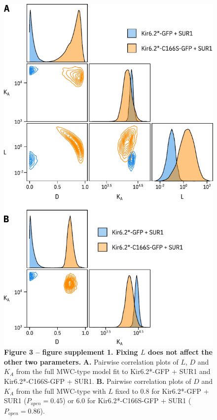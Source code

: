 \documentclass[10pt,lineno, doublespacing]{elife_modified}
\begin{document}
\begin{figure}
\begin{fullwidth}
\centering
\includegraphics[height=0.88\textheight]{figure_three_s1}
\captionsetup{labelformat=empty}
\caption{
\textbf{Figure 3 -- figure supplement 1. Fixing $L$ does not affect the other two parameters.}
\textbf{A.}
Pairwise correlation plots of $L$, $D$ and $K_A$ from the full MWC-type model fit to Kir6.2*-GFP + SUR1 and Kir6.2*-C166S-GFP + SUR1.
\textbf{B.}
Pairwise correlation plots of $D$ and $K_A$ from the full MWC-type with $L$ fixed to 0.8 for Kir6.2*-GFP + SUR1 ($P_{open} = 0.45$) or 6.0 for Kir6.2*-C166S-GFP + SUR1 ($P_{open} = 0.86$).
}
\label{fig:three_s1}
\end{fullwidth}
\end{figure}
\end{document}

